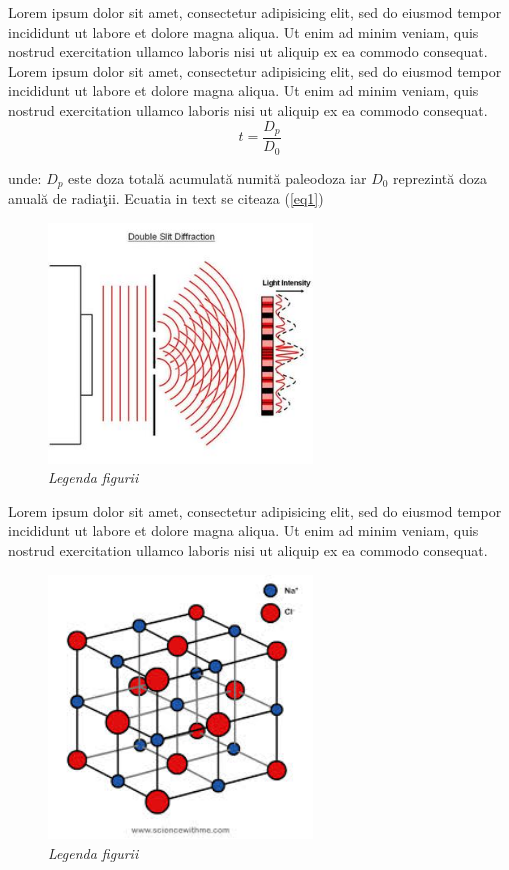 \documentclass[12pt,openright,twoside]{book}
\begin{document}
Lorem ipsum dolor sit amet, consectetur adipisicing elit, sed do eiusmod tempor incididunt ut labore et dolore magna aliqua. Ut enim ad minim veniam, quis nostrud exercitation ullamco laboris nisi ut aliquip ex ea commodo consequat.
\\

Lorem ipsum dolor sit amet, consectetur adipisicing elit, sed do eiusmod tempor incididunt ut labore et dolore magna aliqua. Ut enim ad minim veniam, quis nostrud exercitation ullamco laboris nisi ut aliquip ex ea commodo consequat.\\

\begin{equation}
t=\frac{D{_{p}}}{D{_{0}}}
\label{eq1}
\end{equation}

\vspace{14pt}

unde: ${D{_{p}}}$ este doza total\u{a} acumulat\u{a} numit\u{a} paleodoza iar ${D{_{0}}}$ reprezint\u{a} doza anual\u{a} de radia\c{t}ii. Ecuatia in text se citeaza (\ref{eq1})\\

\begin{figure}
\centering
\includegraphics[width=7cm]{figure1.jpg}
\caption{\textit{{\small Legenda figurii}}}
\end{figure}

Lorem ipsum dolor sit amet, consectetur adipisicing elit, sed do eiusmod tempor incididunt ut labore et dolore magna aliqua. Ut enim ad minim veniam, quis nostrud exercitation ullamco laboris nisi ut aliquip ex ea commodo consequat.\\

\begin{figure}
 \centering
\includegraphics[width=7cm]{figure2.jpg}
\caption{\textit{{\small Legenda figurii}}}
\label{fig1}
\end{figure}
\end{document}
